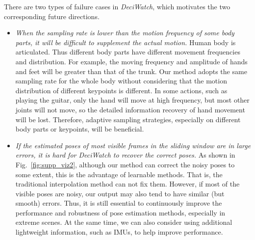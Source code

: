 \documentclass[runningheads]{llncs}
\newcommand{\name}{\emph{DeciWatch}\xspace}
\begin{document}
There are two types of failure cases in \name, which motivates the two corresponding future directions. 
\begin{itemize}

\item \emph{When the sampling rate is lower than the motion frequency of some body parts, it will be difficult to supplement the actual motion.} Human body is articulated. Thus different body parts have different movement frequencies and distribution. For example, the moving frequency and amplitude of hands and feet will be greater than that of the trunk. Our method adopts the same sampling rate for the whole body without considering that the motion distribution of different keypoints is different. In some actions, such as playing the guitar, only the hand will move at high frequency, but most other joints will not move, so the detailed information recovery of hand movement will be lost. Therefore, adaptive sampling strategies, especially on different body parts or keypoints, will be beneficial.

\item \emph{If the estimated poses of most visible frames in the sliding window are in large errors, it is hard for \name to recover the correct poses.} As shown in Fig.~\ref{fig:supp_viz2}, although our method can correct the noisy poses to some extent, this is the advantage of learnable methods. That is, the traditional interpolation method can not fix them. However, if most of the visible poses are noisy, our output may also tend to have similar (but smooth) errors. Thus, it is still essential to continuously improve the performance and robustness of pose estimation methods, especially in extreme scenes. At the same time, we can also consider using additional lightweight information, such as IMUs, to help improve performance.


\end{itemize}








    	
\end{document}
